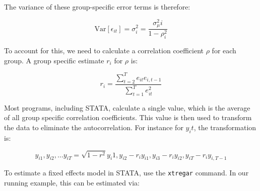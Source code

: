 \documentclass[12pt]{article}
\begin{document}
The variance of these group-specific error terms is therefore:

\begin{equation*}
  \text{Var}[\epsilon_{it}]=\sigma^2_i=\frac{\sigma^2 _\mu i}{1-\rho^2_i}
\end{equation*}

To account for this, we need to calculate a correlation coefficient
$\rho$ for each group. A group specific estimate $r_i$ for $\rho$ is:

\begin{equation*}
  r_i=\frac{\sum_{t=2} ^{T} e_{it} e_{i,t-1}}{\sum_{t=1} ^{T}e^2_{it}}
\end{equation*}

Most programs, including STATA, calculate a single value, which is the
average of all group specific correlation coefficients. This value is
then used to transform the data to eliminate the autocorrelation. For
instance for $y_it$, the transformation is:

\begin{equation*}
  y_{i1}, y_{i2},\ldots y_{iT}= \sqrt{1-r^2}y_i1, y_{i2}-r_i y_{i1},
  y_{i3}-r_i y_{i2}, y_{iT}-r_iy_{i,T-1}
\end{equation*}


To estimate a fixed effects model in STATA, use the \texttt{xtregar}
command. In our running example, this can be estimated via: 
\end{document}
